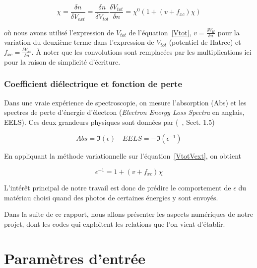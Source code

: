 \documentclass[12pt, french]{report}
\theoremstyle{theoreme}
\begin{document}
\begin{equation}
  \label{eqn-chi0chi}
  \chi = \frac{\delta n}{\delta V_{ext}}
       = \frac{\delta n}{\delta V_{tot}} \frac{\delta V_{tot}}{\delta n}
       = \chi^0 ( 1 + (v+f_{xc})\chi)
\end{equation}

où nous avons utilisé l'expression de $V_{tot}$ de l'équation~\ref{Vtot}, $v = \frac{\delta V_H}{\delta n}$ pour la variation du deuxième terme dans l'expression de $V_{tot}$ (potentiel de Hatree) et $f_{xc} = \frac{\delta V_{xc}}{\delta n}$. À noter que les convolutions sont remplacées par les multiplications ici pour la raison de simplicité d'écriture.


\subsection{Coefficient diélectrique et fonction de perte}
\label{subsec-eels}
Dans une vraie expérience de spectroscopie, on mesure l'absorption (Abs) et les spectres de perte d'énergie d'électron (\textit{Electron Energy Loss Spectra} en anglais, EELS). Ces deux grandeurs physiques sont données par (~\cite{Sot03}, Sect. 1.5)

$$
Abs = \mathfrak{I}(\epsilon) \quad EELS = -\mathfrak{I}(\epsilon^{-1})
$$

En appliquant la méthode variationnelle sur l'équation~\ref{VtotVext}, on obtient

\begin{equation}\label{epsilon}
  \epsilon^{-1} = 1+ (v + f_{xc})\chi
\end{equation}

L'intérêt principal de notre travail est donc de prédire le comportement de $\epsilon$ du matériau choisi quand des photos de certaines énergies y sont envoyés.

Dans la suite de ce rapport, nous allons présenter les aspects numériques de notre projet, dont les codes qui exploitent les relations que l'on vient d'établir.



\appendix
\chapter{Paramètres d'entrée}
\end{document}
